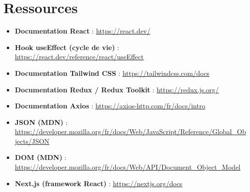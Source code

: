 \section*{Ressources}

\begin{itemize}
	\item \textbf{Documentation React} : \url{https://react.dev/}
	\item \textbf{Hook useEffect (cycle de vie)} : \url{https://react.dev/reference/react/useEffect}
	\item \textbf{Documentation Tailwind CSS} : \url{https://tailwindcss.com/docs}
	\item \textbf{Documentation Redux / Redux Toolkit} : \url{https://redux.js.org/}
	\item \textbf{Documentation Axios} : \url{https://axios-http.com/fr/docs/intro}
	\item \textbf{JSON (MDN)} : \url{https://developer.mozilla.org/fr/docs/Web/JavaScript/Reference/Global_Objects/JSON}
	\item \textbf{DOM (MDN)} : \url{https://developer.mozilla.org/fr/docs/Web/API/Document_Object_Model}
	\item \textbf{Next.js (framework React)} : \url{https://nextjs.org/docs}
\end{itemize}
